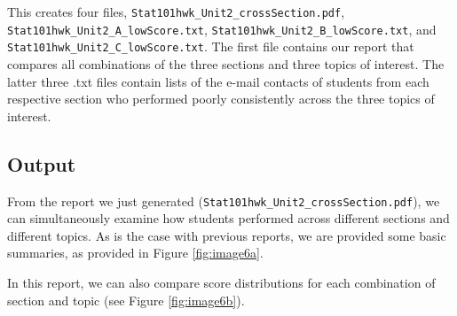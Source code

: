 \documentclass[11pt,a4paper,oldfontcommands,openany]{memoir}
\numberwithin{equation}{section} %
\begin{document}
This creates four files, \texttt{Stat101hwk\_Unit2\_crossSection.pdf}, \texttt{Stat101hwk\_Unit2\_A\_lowScore.txt}, \texttt{Stat101hwk\_Unit2\_B\_lowScore.txt}, and \texttt{Stat101hwk\_Unit2\_C\_lowScore.txt}. The first file contains our report that compares all combinations of the three sections and three topics of interest. The latter three .txt files contain lists of the e-mail contacts of students from each respective section who performed poorly consistently across the three topics of interest.

\subsection{Output}

From the report we just generated (\texttt{Stat101hwk\_Unit2\_crossSection.pdf}), we can simultaneously examine how students performed across different sections and different topics. As is the case with previous reports, we are provided some basic summaries, as provided in Figure \ref{fig:image6a}.

\begin{center}
\captionsetup{width=0.4\textwidth}
\label{fig:image6a}
\end{center}

In this report, we can also compare score distributions for each combination of section and topic (see Figure \ref{fig:image6b}).

\begin{center}
\captionsetup{width=0.8\textwidth}
\label{fig:image6b}
\end{center}
\end{document}
